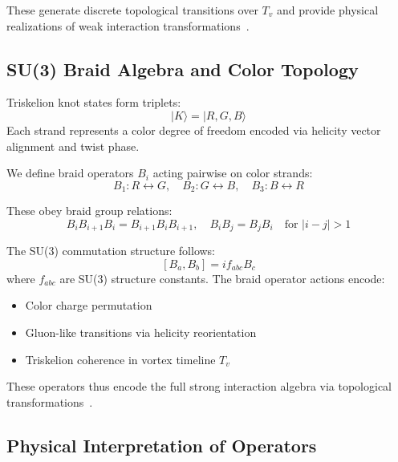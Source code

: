 \documentclass[preprint]{revtex4-2}
\begin{document}
            These generate discrete topological transitions over \( T_v \) and provide physical realizations of weak interaction transformations~\cite{volovik2003universe, ranada1990topological}.
        
            \subsection{SU(3) Braid Algebra and Color Topology}
        
            Triskelion knot states form triplets:
            \[
            |K\rangle = |R, G, B\rangle
            \]
            Each strand represents a color degree of freedom encoded via helicity vector alignment and twist phase.
        
            We define braid operators \( B_i \) acting pairwise on color strands:
            \[
            B_1: R \leftrightarrow G, \quad B_2: G \leftrightarrow B, \quad B_3: B \leftrightarrow R
            \]
        
            These obey braid group relations:
            \[
            B_i B_{i+1} B_i = B_{i+1} B_i B_{i+1}, \quad B_i B_j = B_j B_i \quad \text{for } |i - j| > 1
            \]
        
            The SU(3) commutation structure follows:
            \[
            [B_a, B_b] = i f_{abc} B_c
            \]
            where \( f_{abc} \) are SU(3) structure constants. The braid operator actions encode:
            \begin{itemize}
                \item Color charge permutation
                \item Gluon-like transitions via helicity reorientation
                \item Triskelion coherence in vortex timeline \( T_v \)
            \end{itemize}
        
            These operators thus encode the full strong interaction algebra via topological transformations~\cite{moffatt1969knottedness}.
        
            \subsection*{Physical Interpretation of Operators}
        
\end{document}
